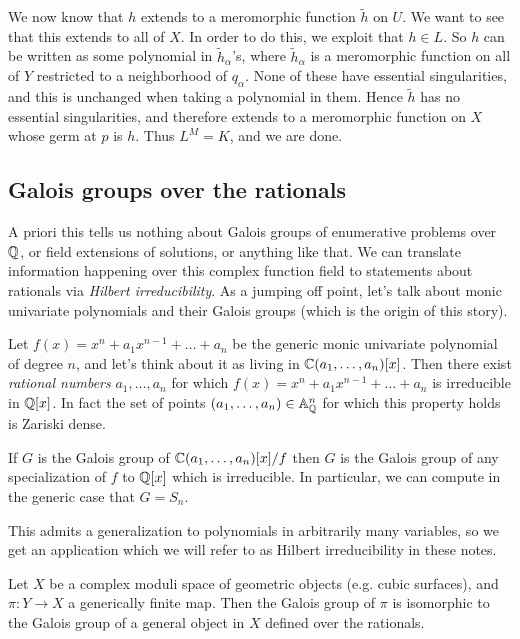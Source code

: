 \documentclass[11pt]{amsart}
\let\til\widetilde
\begin{document}
We now know that $h$ extends to a meromorphic function $\til{h}$ on $U$. We want to see that this extends to all of $X$. In order to do this, we exploit that $h \in L$. So $h$ can be written as some polynomial in $\til{h}_\alpha$'s, where $\til{h}_\alpha$ is a meromorphic function on all of $Y$ restricted to a neighborhood of $q_\alpha$. None of these have essential singularities, and this is unchanged when taking a polynomial in them. Hence $\til{h}$ has no essential singularities, and therefore extends to a meromorphic function on $X$ whose germ at $p$ is $h$. Thus $L^M = K$, and we are done.

\subsection{Galois groups over the rationals}

A priori this tells us nothing about Galois groups of enumerative problems over $\mathbb{Q}$, or field extensions of solutions, or anything like that. We can translate information happening over this complex function field to statements about rationals via \textit{Hilbert irreducibility}. As a jumping off point, let's talk about monic univariate polynomials and their Galois groups (which is the origin of this story).

\begin{example} Let $f(x) = x^n + a_1 x^{n-1} + \ldots + a_n$ be the generic monic univariate polynomial of degree $n$, and let's think about it as living in $\mathbb{C}(a_1, \ldots, a_n)[x]$. Then there exist \textit{rational numbers} $a_1, \ldots, a_n$ for which $f(x) = x^n + a_1 x^{n-1} + \ldots + a_n$ is irreducible in $\mathbb{Q}[x]$. In fact the set of points $(a_1, \ldots, a_n) \in \mathbb{A}^n_{\mathbb{Q}}$ for which this property holds is Zariski dense.
\end{example}

\begin{corollary} If $G$ is the Galois group of $\mathbb{C}(a_1, \ldots, a_n)[x] / f$ then $G$ is the Galois group of any specialization of $f$ to $\mathbb{Q}[x]$ which is irreducible. In particular, we can compute in the generic case that $G = S_n$.
\end{corollary}

This admits a generalization to polynomials in arbitrarily many variables, so we get an application which we will refer to as Hilbert irreducibility in these notes.

\begin{slogan} Let $X$ be a complex moduli space of geometric objects (e.g. cubic surfaces), and $\pi \colon Y \to X$ a generically finite map. Then the Galois group of $\pi$ is isomorphic to the Galois group of a general object in $X$ defined over the rationals.
\end{slogan}
\end{document}

